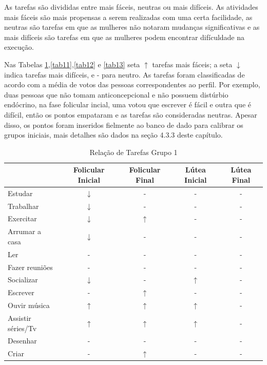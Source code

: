 As tarefas são divididas entre mais fáceis, neutras ou mais difíceis. As atividades mais fáceis 
são mais propensas a serem realizadas com uma certa facilidade, as neutras são tarefas em que as mulheres não 
notaram mudanças significativas e as mais difíceis são tarefas em que as mulheres podem encontrar difículdade 
na execução.

Nas Tabelas \ref{tab10},\ref{tab11},\ref{tab12} e \ref{tab13} seta $\uparrow$ tarefas mais fáceis; a seta $\downarrow$ indica tarefas mais difíceis, e - para neutro. As tarefas 
foram classificadas de acordo com a média de votos das pessoas correspondentes ao perfil. Por exemplo, duas 
pessoas que não tomam anticoncepcional e não possuem distúrbio endócrino, na fase folicular incial, 
uma votou que escrever é fácil e outra que é difícil, então os pontos empataram e as tarefas são consideradas neutras.
Apesar disso, os pontos foram inseridos fielmente ao banco de dado para calibrar os grupos iniciais, mais detalhes são dados
na seção 4.3.3 deste capítulo.

\begin{table}[]
    \centering
    \caption{Relação de Tarefas Grupo 1}
    \label{tab10}
    \begin{tabular}{|l|c|c|c|c|}
    \hline
    \rowcolor[HTML]{C0C0C0} 
    \multicolumn{1}{|c|}{\cellcolor[HTML]{C0C0C0}Tarefas recomendadas}  & Folicular Inicial & Folicular Final  & Lútea Inicial& Lútea Final \\ \hline
    Estudar & $\downarrow$  & - & - & - \\ \hline
    \rowcolor[HTML]{EFEFEF} 
    Trabalhar & $\downarrow$ & -  & -&  -  \\ \hline
    Exercitar & $\downarrow$ & $\uparrow$ & - &  -  \\ \hline
    \rowcolor[HTML]{EFEFEF} 
    Arrumar a casa  & $\downarrow$ & -  & - & - \\ \hline
    Ler & - & -  & - & - \\ \hline
    \rowcolor[HTML]{EFEFEF} 
    Fazer reuniões & - & - & - & - \\ \hline
    \rowcolor[HTML]{EFEFEF} 
    Socializar & $\downarrow$ & - & $\uparrow$ & - \\ \hline
    \rowcolor[HTML]{EFEFEF} 
    Escrever & - & $\uparrow$  & - & - \\ \hline
    Ouvir música & $\uparrow$ & $\uparrow$ & $\uparrow$ & - \\ \hline
    \rowcolor[HTML]{EFEFEF} 
    Assistir séries/Tv & $\uparrow$ & $\uparrow$ & $\uparrow$ & - \\ \hline
    Desenhar & - & -  & - & - \\ \hline
    \rowcolor[HTML]{EFEFEF} 
    Criar & - & $\uparrow$  & - & - \\ \hline
    \end{tabular}
    \end{table}

